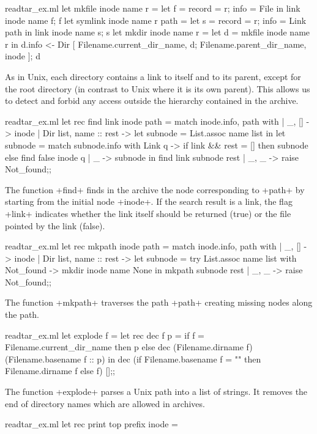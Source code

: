 \begin{answer}
\begin{listingcodefile}{readtar_ex.ml}
let mkfile inode name r = 
  let f =  { record = r; info = File } in
  link inode name f; f
let symlink inode name r path =   
  let s =  { record = r; info = Link path } in
  link inode name s; s
let mkdir inode name r = 
  let d = mkfile inode name r in
  d.info <- 
    Dir [ Filename.current_dir_name, d; Filename.parent_dir_name, inode ];
  d
\end{listingcodefile}
%
As in Unix, each directory contains a link to itself and 
to its parent, except for the root directory (in contrast to Unix
where it is its own parent). This allows us to detect and
forbid any access outside the hierarchy contained in the archive.
%
\begin{listingcodefile}{readtar_ex.ml}
let rec find link inode path = match inode.info, path with 
  | _, [] -> inode
  | Dir list, name :: rest ->  
      let subnode = List.assoc name list in 
      let subnode = 
        match subnode.info with 
          Link q -> 
            if link && rest = [] then subnode else find false inode q 
        | _ -> subnode  in 
      find link subnode rest
  | _, _ -> raise Not_found;;
\end{listingcodefile}
% 
The function \ml+find+ finds in the archive the node corresponding to
\ml+path+ by starting from the initial node \ml+inode+.  If the search
result is a link, the flag \ml+link+ indicates whether the link itself
should be returned (true) or the file pointed by the link (false).
%
\begin{listingcodefile}{readtar_ex.ml}
let rec mkpath inode path = 
  match inode.info, path with 
  | _, [] -> inode
  | Dir list, name :: rest -> 
      let subnode = 
        try List.assoc name list 
        with Not_found ->  mkdir inode name None in 
      mkpath subnode rest
  | _, _ -> raise Not_found;;
\end{listingcodefile}
%
The function \ml+mkpath+ traverses the path \ml+path+ creating missing
nodes along the path. 
%
\begin{listingcodefile}{readtar_ex.ml}
let explode f =
  let rec dec f p = 
    if f = Filename.current_dir_name then p
    else dec (Filename.dirname f) (Filename.basename f :: p) in
  dec (if Filename.basename f = "" then Filename.dirname f else f) [];;
\end{listingcodefile}
%
The function \ml+explode+ parses a Unix path into a list of strings. 
It removes the end \quotes{\ml+/+} of directory names which are allowed 
in archives. 
%
\begin{codefile}{readtar_ex.ml}
let rec print top prefix inode  =

\end{codefile}
\end{answer}
